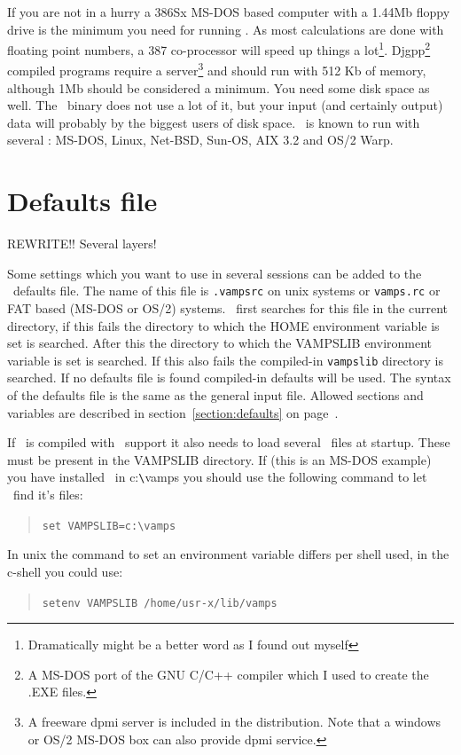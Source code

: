 If you are not in a hurry a 386Sx MS-DOS based computer with a 1.44Mb
floppy drive is the minimum you need for running \vamps. As most
calculations are done with floating point numbers, a 387 co-processor
will speed up things a lot\footnote{Dramatically might be a better word
as I found out myself}. Djgpp\footnote{A MS-DOS port of the GNU C/C++
compiler which I used to create the .EXE files.} compiled programs
require a {\sc {}} server\footnote{A freeware {\sc dpmi}
server is included in the distribution. Note that a windows or OS/2
MS-DOS box can also provide {\sc dpmi} service.} and should run with 512
Kb of memory, although 1Mb should be considered a minimum. You need
some disk space as well. The \vamps\ binary does not use a lot of it,
but your input (and certainly output) data will probably by the
biggest users of disk space. \vamps\ is known to run with several
: MS-DOS, Linux, Net-BSD, Sun-OS, AIX 3.2 and OS/2
Warp. 

\section{Defaults file}
REWRITE!! Several layers!

Some settings which you want to use in several sessions can be added
to the \vamps\ defaults file. The name of this file is {\tt .vampsrc} on
unix systems or {\tt vamps.rc} or FAT based (MS-DOS or OS/2) systems.
\vamps\ first searches for this file in the current directory, if
this fails the directory to which the HOME environment variable is set
is searched.  After this the directory to which the VAMPSLIB
environment variable is set is searched. If this also fails the
compiled-in {\tt vampslib} directory is searched.  If no defaults file
is found compiled-in defaults will be used. The syntax of the defaults
file is the same as the general input file. Allowed sections and
variables are described in section~\ref{section:defaults} on
page~\pageref{section:defaults}.

If \vamps\ is compiled with \slang\ support it also needs to load
several \slang\ files at startup. These must be present in the
VAMPSLIB directory. If (this is an MS-DOS example) you have installed
\vamps\ in c:\verb-\-vamps you should use the following command to let
\vamps\ find it's files:
\begin{quote}
{\tt set VAMPSLIB=c:\verb-\-vamps}
\end{quote}
In {\sc unix} the command to set an environment variable differs
per shell used, in the c-shell you could use: 
\begin{quote}
{\tt setenv VAMPSLIB /home/usr-x/lib/vamps}
\end{quote}


